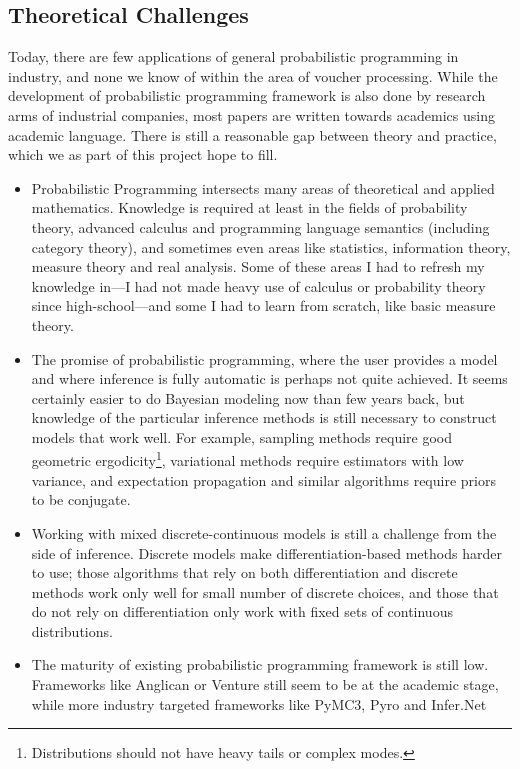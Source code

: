\documentclass[12pt,a4paper]{article}
\begin{document}
\subsection{Theoretical Challenges}
Today, there are few applications of general probabilistic programming in
industry, and none we know of within the area of voucher processing. While the
development of probabilistic programming framework is also done by research arms
of industrial companies, most papers are written towards academics using
academic language. There is still a reasonable gap between theory and practice,
which we as part of this project hope to fill.
\begin{itemize}
\item Probabilistic Programming intersects many areas of theoretical and applied
  mathematics. Knowledge is required at least in the fields of probability
  theory, advanced calculus and programming language semantics (including
  category theory), and sometimes even areas like statistics, information
  theory, measure theory and real analysis.
  Some of these areas I had to refresh my knowledge in---I had
  not made heavy use of calculus or probability theory since high-school---and
  some I had to learn from scratch, like basic measure theory.
\item The promise of probabilistic programming, where the user provides a model
  and where inference is fully automatic is perhaps not quite achieved. It seems
  certainly easier to do Bayesian modeling now than few years back, but
  knowledge of the particular inference methods is still necessary to construct
  models that work well. For example, sampling methods require good geometric
  ergodicity\footnote{Distributions should not have heavy tails or complex
modes.}, variational methods require estimators with low variance, and
  expectation propagation and similar algorithms require priors to be conjugate.
\item Working with mixed discrete-continuous models is still a challenge from the
  side of inference. Discrete models make differentiation-based methods harder
  to use; those algorithms that rely on both differentiation and discrete
  methods work only well for small number of discrete choices, and those that do
  not rely on differentiation only work with fixed sets of continuous distributions.
\item The maturity of existing probabilistic programming framework is still low.
  Frameworks like Anglican or Venture still seem to be at the academic
  stage, while more industry targeted frameworks like PyMC3, Pyro and Infer.Net

\end{itemize}
\end{document}

